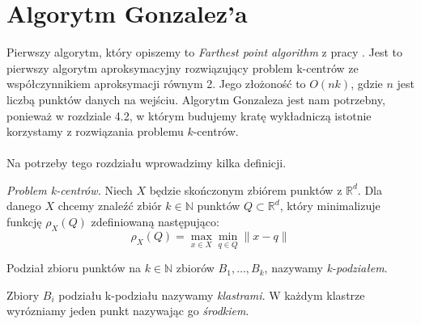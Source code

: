 \section{Algorytm Gonzalez'a}

Pierwszy algorytm, który opiszemy to \textit{Farthest point algorithm} z pracy \cite{Gonzalez1985ClusteringTM}.
Jest to pierwszy algorytm aproksymacyjny rozwiązujący problem k-centrów ze współczynnikiem aproksymacji równym 2.
Jego złożoność to $O(nk)$, gdzie $n$ jest liczbą punktów danych na wejściu.
Algorytm Gonzaleza jest nam potrzebny, ponieważ w rozdziale 4.2, w którym budujemy kratę wykładniczą istotnie korzystamy z rozwiązania problemu $k$-centrów.
\\~\\
Na potrzeby tego rozdziału wprowadzimy kilka definicji.
\begin{definition}
    \emph{Problem k-centrów.} Niech $X$ będzie skończonym zbiórem punktów z $\mathbb{R}^{d}$. 
    Dla danego $X$ chcemy znaleźć zbiór $k \in \mathbb{N}$ punktów $Q \subset \mathbb{R}^{d}$, który minimalizuje funkcję $\rho_{X}(Q)$ zdefiniowaną następująco:
    \begin{equation}
        \rho_{X}(Q) = \max_{x \in X} \min_{q \in Q} \| x - q \|
    \end{equation}
\end{definition}

\begin{definition}
    Podział zbioru punktów na $k \in \mathbb{N}$ zbiorów $B_{1},\dots,B_{k}$, nazywamy \emph{k-podziałem}.
\end{definition}

\begin{definition}
    Zbiory $B_{i}$ podziału k-podziału nazywamy \emph{klastrami}.
    W każdym klastrze wyrózniamy jeden punkt nazywając go \emph{środkiem}.
\end{definition}


